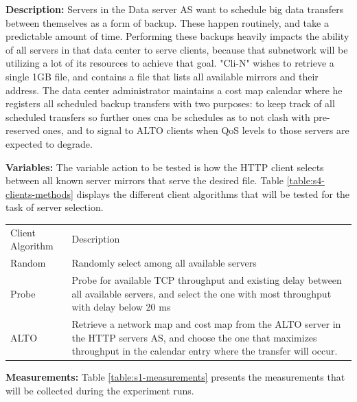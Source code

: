 \textbf{Description:} Servers in the Data server AS want to schedule big data transfers between themselves as a form of backup.
These happen routinely, and take a predictable amount of time.
Performing these backups heavily impacts the ability of all servers in that data center to serve clients, because that subnetwork will be utilizing a lot of its resources to achieve that goal.
"Cli-N" wishes to retrieve a single 1GB file, and contains a file that lists all available mirrors and their address.
The data center administrator maintains a cost map calendar where he registers all scheduled backup transfers with two purposes: to keep track of all scheduled transfers so further ones cna be schedules as to not clash with pre-reserved ones, and to signal to ALTO clients when QoS levels to those servers are expected to degrade.

\textbf{Variables: } The variable action to be tested is how the HTTP client selects between all known server mirrors that serve the desired file.
Table \ref{table:s4-clients-methods} displays the different client algorithms that will be tested for the task of server selection.

\begin{table}[]
\begin{tabular}{ll}
Client Algorithm & Description                                                                                                                                                                                                \\
Random            & Randomly select among all available servers                                                                                                                                                                  \\
Probe             & Probe for available TCP throughput and existing delay between all available servers, and select the one with most throughput with delay below 20 ms
                                                             \\
ALTO              & Retrieve a network map and cost map from the ALTO server in the HTTP servers AS, and choose the one that maximizes throughput in the calendar entry where the transfer will occur.
\end{tabular}
\label{table:s5-tracker-methods}
\end{table}

\textbf{Measurements:} Table \ref{table:s1-measurements} presents the measurements that will be collected during the experiment runs.

